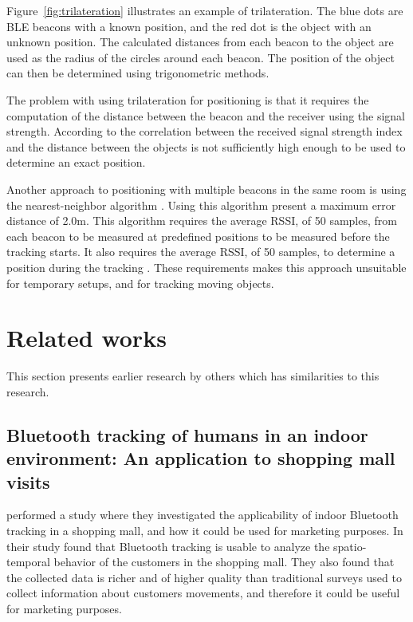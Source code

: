 \documentclass[../Main/thesis.tex]{subfiles}
\begin{document}
Figure~\ref{fig:trilateration} illustrates an example of trilateration.
The blue dots are BLE beacons with a known position, and the red dot is the object with an unknown position.
The calculated distances from each beacon to the object are used as the radius of the circles around each beacon.
The position of the object can then be determined using trigonometric methods.

The problem with using trilateration for positioning is that it requires the computation of the distance between the beacon and the receiver using the signal strength.
According to \citet{Chawathe} the correlation between the received signal strength index and the distance between the objects is not sufficiently high enough to be used to determine an exact position.

Another approach to positioning with multiple beacons in the same room is using the nearest-neighbor algorithm \citep{Takahashi2016}.
Using this algorithm \citet{Takahashi2016} present a maximum error distance of 2.0m.
This algorithm requires the average RSSI, of 50 samples, from each beacon to be measured at predefined positions to be measured before the tracking starts.
It also requires the average RSSI, of 50 samples, to determine a position during the tracking \citep{Takahashi2016}.
These requirements makes this approach unsuitable for temporary setups, and for tracking moving objects.


\section{Related works} 
This section presents earlier research by others which has similarities to this research.

\subsection{Bluetooth tracking of humans in an indoor environment: An application to shopping mall visits}
\label{sec:ble-tracking-mall}
\citet{Oosterlinck2017} performed a study where they investigated the applicability of indoor Bluetooth tracking in a shopping mall, and how it could be used for marketing purposes.
In their study \citep{Oosterlinck2017} found that Bluetooth tracking is usable to analyze the spatio-temporal behavior of the customers in the shopping mall.
They also found that the collected data is richer and of higher quality than traditional surveys used to collect information about customers movements, and therefore it could be useful for marketing purposes.
\end{document}
